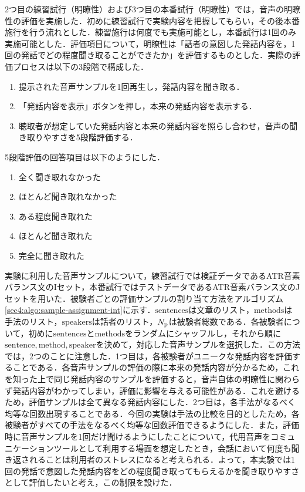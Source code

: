 2つ目の練習試行（明瞭性）および3つ目の本番試行（明瞭性）では，音声の明瞭性の評価を実施した．初めに練習試行で実験内容を把握してもらい，その後本番施行を行う流れとした．練習施行は何度でも実施可能とし，本番試行は1回のみ実施可能とした．評価項目について，明瞭性は「話者の意図した発話内容を，1回の発話でどの程度聞き取ることができたか」を評価するものとした．実際の評価プロセスは以下の3段階で構成した．
\begin{enumerate}
    \item 提示された音声サンプルを1回再生し，発話内容を聞き取る．
    \item 「発話内容を表示」ボタンを押し，本来の発話内容を表示する．
    \item 聴取者が想定していた発話内容と本来の発話内容を照らし合わせ，音声の聞き取りやすさを5段階評価する．
\end{enumerate}
5段階評価の回答項目は以下のようにした．
\begin{enumerate}
    \item 全く聞き取れなかった
    \item ほとんど聞き取れなかった
    \item ある程度聞き取れた
    \item ほとんど聞き取れた
    \item 完全に聞き取れた
\end{enumerate}
実験に利用した音声サンプルについて，練習試行では検証データであるATR音素バランス文のIセット，本番試行ではテストデータであるATR音素バランス文のJセットを用いた．被験者ごとの評価サンプルの割り当て方法をアルゴリズム\ref{sec4:algo:sample-assignment-int}に示す．$\text{sentences}$は文章のリスト，$\text{methods}$は手法のリスト，$\text{speakers}$は話者のリスト，$N_{\text{p}}$は被験者総数である．各被験者について，初めに$\text{sentences}$と$\text{methods}$をランダムにシャッフルし，それから順に$\text{sentence}, \text{method}, \text{speaker}$を決めて，対応した音声サンプルを選択した．この方法では，2つのことに注意した．1つ目は，各被験者がユニークな発話内容を評価することである．各音声サンプルの評価の際に本来の発話内容が分かるため，これを知った上で同じ発話内容のサンプルを評価すると，音声自体の明瞭性に関わらず発話内容がわかってしまい，評価に影響を与える可能性がある．これを避けるため，評価サンプルは全て異なる発話内容にした．2つ目は，各手法がなるべく均等な回数出現することである．今回の実験は手法の比較を目的としたため，各被験者がすべての手法をなるべく均等な回数評価できるようにした．また，評価時に音声サンプルを1回だけ聞けるようにしたことについて，代用音声をコミュニケーションツールとして利用する場面を想定したとき，会話において何度も聞き返されることは利用者のストレスになると考えられる．よって，本実験では1回の発話で意図した発話内容をどの程度聞き取ってもらえるかを聞き取りやすさとして評価したいと考え，この制限を設けた．
